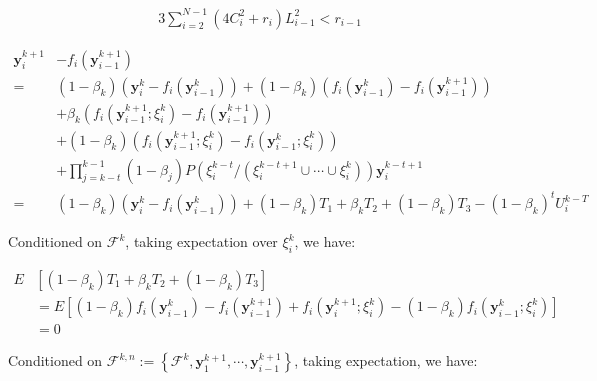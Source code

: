 \begin{equation*}
\begin{split}
3\sum_{i=2}^{N-1}\left ( 4C_i^2+r_i \right )L_{i-1}^2<r_{i-1}
\end{split}
\end{equation*}

\begin{equation*}
\begin{split}
\boldsymbol{y}_i^{k+1}&-f_i\left ( \boldsymbol{y}_{i-1}^{k+1} \right )\\
=&\left ( 1-\beta_k \right )\left ( \boldsymbol{y}_i^k-f_i\left ( \boldsymbol{y}_{i-1}^k \right ) \right )+\left ( 1-\beta_k \right )\left ( f_i\left ( \boldsymbol{y}_{i-1}^k\right )-f_i\left ( \boldsymbol{y}_{i-1}^{k+1} \right ) \right ) \\
&+\beta_k\left ( f_i\left ( \boldsymbol{y}_{i-1}^{k+1};\xi_i^k \right )-f_i\left ( \boldsymbol{y}_{i-1}^{k+1} \right ) \right )\\
&+\left ( 1-\beta_k \right )\left ( f_i\left ( \boldsymbol{y}_{i-1}^{k+1};\xi_i^k \right )-f_i\left ( \boldsymbol{y}_{i-1}^k;\xi_i^k \right ) \right )\\
&+\prod _{j=k-t}^{k-1}\left ( 1-\beta_j \right )P\left ( \xi_i^{k-t}/\left ( 
\xi_i^{k-t+1}\cup \cdots \cup\xi_i^k \right ) \right )\boldsymbol{y}_i^{k-t+1}\\
=&\left ( 1-\beta_k \right )\left ( \boldsymbol{y}_i^k-f_i\left ( \boldsymbol{y}_{i-1}^k \right ) \right )+\left ( 1-\beta_k \right )T_1+\beta_kT_2+\left ( 1-\beta_k \right )T_3-\left ( 1-\beta_k \right )^tU_i^{k-T}
\end{split}
\end{equation*}

Conditioned on $\mathcal{F}^k$, taking expectation over $\xi_i^k$, we have:

\begin{equation*}
\begin{split}
E&\left [ \left ( 1-\beta_k \right )T_1+\beta_kT_2+\left ( 1-\beta_k \right )T_3 \right ]\\
&=E\left [ \left ( 1-\beta_k \right )f_i\left ( \boldsymbol{y}_{i-1}^k \right )-f_i\left ( \boldsymbol{y}_{i-1}^{k+1}\right )+f_i\left ( \boldsymbol{y}_i^{k+1};\xi_i^k  \right )-\left ( 1-\beta_k \right )f_i\left ( \boldsymbol{y}_{i-1}^k;\xi_i^k \right ) \right ]\\
&=0
\end{split}
\end{equation*}

Conditioned on $\mathcal{F}^{k,n}:=\left \{ \mathcal{F}^k,\boldsymbol{y}_1^{k+1},\cdots,\boldsymbol{y}_{i-1}^{k+1} \right \}$, taking expectation, we have:

